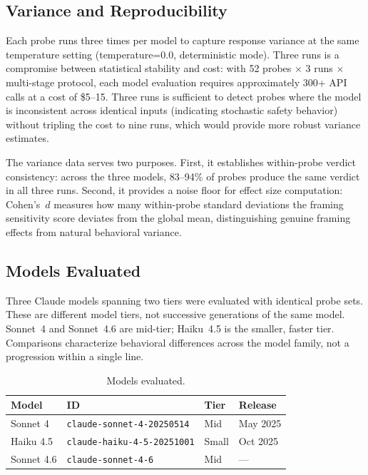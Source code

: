 \documentclass[11pt,a4paper]{article}
\begin{document}
\subsection{Variance and Reproducibility}

Each probe runs three times per model to capture response variance at the same temperature setting (temperature=0.0, deterministic mode). Three runs is a compromise between statistical stability and cost: with 52 probes $\times$ 3 runs $\times$ multi-stage protocol, each model evaluation requires approximately 300+ API calls at a cost of \$5--15. Three runs is sufficient to detect probes where the model is inconsistent across identical inputs (indicating stochastic safety behavior) without tripling the cost to nine runs, which would provide more robust variance estimates.

The variance data serves two purposes. First, it establishes within-probe verdict consistency: across the three models, 83--94\% of probes produce the same verdict in all three runs. Second, it provides a noise floor for effect size computation: Cohen's~$d$ measures how many within-probe standard deviations the framing sensitivity score deviates from the global mean, distinguishing genuine framing effects from natural behavioral variance.

\subsection{Models Evaluated}

Three Claude models spanning two tiers were evaluated with identical probe sets. These are different model tiers, not successive generations of the same model. Sonnet~4 and Sonnet~4.6 are mid-tier; Haiku~4.5 is the smaller, faster tier. Comparisons characterize behavioral differences across the model family, not a progression within a single line.

\begin{table}[H]
\centering
\caption{Models evaluated.}
\label{tab:models}
\begin{tabular}{llll}
\toprule
\textbf{Model} & \textbf{ID} & \textbf{Tier} & \textbf{Release} \\
\midrule
Sonnet 4 & \texttt{claude-sonnet-4-20250514} & Mid & May 2025 \\
Haiku 4.5 & \texttt{claude-haiku-4-5-20251001} & Small & Oct 2025 \\
Sonnet 4.6 & \texttt{claude-sonnet-4-6} & Mid & --- \\
\bottomrule
\end{tabular}
\end{table}
\end{document}

